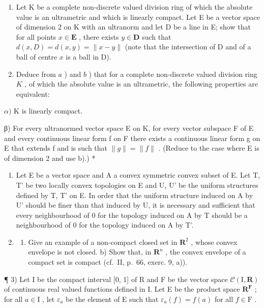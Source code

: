 \begin{enumerate}
\def\labelenumi{\alph{enumi})}
\setcounter{enumi}{1}
\item
  Let K be a complete non-discrete valued division ring of which the absolute value is an ultrametric and which is linearly compact. Let E be a vector space of dimension 2 on K with an ultranorm and let D be a line in E; show that for all points \(x \in \mathbf{E}\) , there exists \(y \in \mathbf{D}\) such that \(d(x, D) = d(x, y) = \| x - y \|\) (note that the intersection of D and of a ball of centre \(x\) is a ball in D).
\item
  Deduce from \(a\) ) and \(b\) ) that for a complete non-discrete valued division ring \(K\) , of which the absolute value is an ultrametric, the following properties are equivalent:
\end{enumerate}

\(\alpha)\) K is linearly compact.

β) For every ultranormed vector space E on K, for every vector subspace F of E and every continuous linear form f on F there exists a continuous linear form g on E that extends f and is such that \(\|g\| = \|f\|\) . (Reduce to the case where E is of dimension 2 and use b).) *

\exercisegroup

\begin{enumerate}
\def\labelenumi{\arabic{enumi})}
\item
  Let E be a vector space and A a convex symmetric convex subset of E. Let T, T' be two locally convex topologies on E and U, U' be the uniform structures defined by T, T' on E. In order that the uniform structure induced on A by U' should be finer than that induced by U, it is necessary and sufficient that every neighbourhood of 0 for the topology induced on A by T should be a neighbourhood of 0 for the topology induced on A by T'.
\item
  \begin{enumerate}
  \def\labelenumii{\alph{enumii})}
  \tightlist
  \item
    Give an example of a non-compact closed set in \(\mathbf{R}^2\) , whose convex envelope is not closed. b) Show that, in \(\mathbf{R}^n\) , the convex envelope of a compact set is compact (cf.~II, p.~66, exerc. 9, a)).
  \end{enumerate}
\end{enumerate}

¶ 3) Let I be the compact interval {[}0, 1{]} of R and F be the vector space \(\mathcal{C}(\mathrm{I},\mathbf{R})\) of continuous real valued functions defined in I. Let E be the product space \(\mathbf{R}^{\mathbf{F}}\) ; for all \(a\in\mathrm{I}\) , let \(\varepsilon_{a}\) be the element of E such that \(\varepsilon_{a}(f)=f(a)\) for all \(f\in\mathrm{F}\) .

